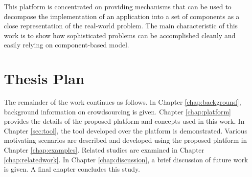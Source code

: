 This platform is concentrated on providing mechanisms that can be used to decompose 
the implementation of an application into a set of components as a close representation 
of the real-world problem. The main characteristic of this work is to show how 
sophisticated problems can be accomplished cleanly and easily relying on 
component-based model.


\section{Thesis Plan}

The remainder of the work continues as follows. In Chapter \ref{chap:background}, 
background information on crowdsourcing is given. Chapter \ref{chap:platform} provides 
the details of the proposed platform and concepts used in this work. 
In Chapter \ref{sec:tool}, the tool developed over the platform is demonstrated. 
Various motivating scenarios are described and developed using the proposed 
platform in Chapter \ref{chap:examples}. Related studies are examined in Chapter 
\ref{chap:relatedwork}. In Chapter \ref{chap:discussion}, a brief discussion of future work 
is given. A final chapter concludes this study.
